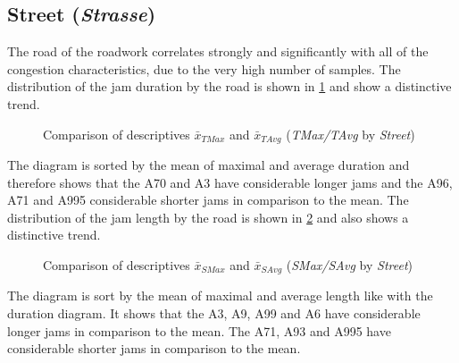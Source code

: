 \subsection{Street (\textit{Strasse})}
The road of the roadwork correlates strongly and significantly with all of the congestion characteristics, due to the very high number of samples. The distribution of the jam duration by the road is shown in \cref{fig:arbis_summary_Str_temporal} and show a distinctive trend.
\begin{figure}[ht!]
	\data
	\pgfplotstablesort[sort key=means, sort cmp=float >]{\datasorted}{\data}
	\tiny
	\centering
	\caption{Comparison of descriptives $\bar{x}_{TMax}$ and $\bar{x}_{TAvg}$ (\textit{TMax/TAvg} by \textit{Street})}
	\label{fig:arbis_summary_Str_temporal}
\end{figure}
The diagram is sorted by the mean of maximal and average duration and therefore shows that the A70 and A3 have considerable longer jams and the A96, A71 and A995 considerable shorter jams in comparison to the mean. The distribution of the jam length by the road is shown in \cref{fig:arbis_summary_Str_spatial} and also shows a distinctive trend.
\begin{figure}[ht!]
	\data
	\pgfplotstablesort[sort key=means, sort cmp=float >]{\datasorted}{\data}
	\tiny
	\centering
	\caption{Comparison of descriptives $\bar{x}_{SMax}$ and $\bar{x}_{SAvg}$ (\textit{SMax/SAvg} by \textit{Street})}
	\label{fig:arbis_summary_Str_spatial}
\end{figure}
The diagram is sort by the mean of maximal and average length like with the duration diagram. It shows that the A3, A9, A99 and A6 have considerable longer jams in comparison to the mean. The A71, A93 and A995 have considerable shorter jams in comparison to the mean.

